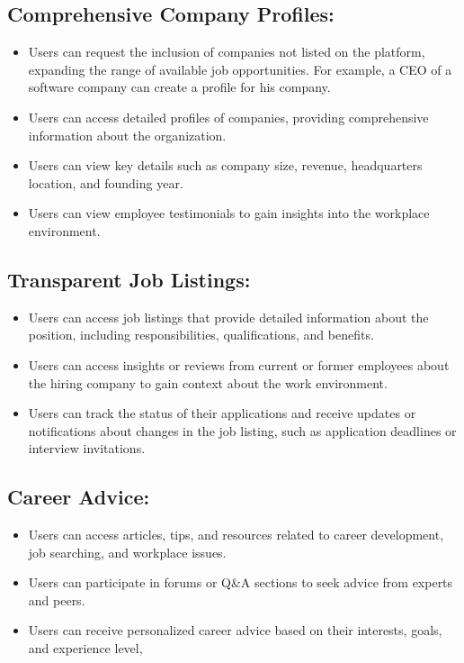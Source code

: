 \documentclass[titlepage]{article}
\begin{document}
\subsection{Comprehensive Company Profiles:}
\begin{itemize}
    \item Users can request the inclusion of companies not listed on the platform, expanding the range of available job opportunities. For example, a CEO of a software company can create a profile for his company.
    \item Users can access detailed profiles of companies, providing comprehensive information about the organization.
    \item Users can view key details such as company size, revenue, headquarters location, and founding year.
    \item Users can view employee testimonials to gain insights into the workplace environment.
\end{itemize}

\subsection{Transparent Job Listings:}
\begin{itemize}
    \item Users can access job listings that provide detailed information about the position, including responsibilities, qualifications, and benefits.
    \item Users can access insights or reviews from current or former employees about the hiring company to gain context about the work environment.
    \item Users can track the status of their applications and receive updates or notifications about changes in the job listing, such as application deadlines or interview invitations.
\end{itemize}

\subsection{Career Advice:}
\begin{itemize}
    \item Users can access articles, tips, and resources related to career development, job searching, and workplace issues.
    \item Users can participate in forums or Q\&A sections to seek advice from experts and peers.
    \item Users can receive personalized career advice based on their interests, goals, and experience level,
\end{itemize}
\end{document}
